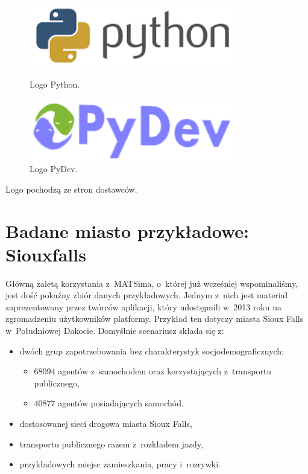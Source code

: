 \documentclass[twoside,12pt]{report}
\begin{document}
\begin{figure}[h]
\begin{flushleft}
	\begin{minipage}[]{.47\textwidth}
	\vspace*{30px}
	\centering
	\includegraphics[width=0.8\textwidth]{img/py}
	\caption{Logo Python.}
	\end{minipage}%
\end{flushleft}
\begin{flushright}
	\begin{minipage}[]{.47\textwidth}
	\centering
	\includegraphics[width=0.8\textwidth]{img/pydev}
	\caption{Logo PyDev.}
	\end{minipage}
\end{flushright}
\end{figure}

Logo pochodzą ze stron dostawców\cite{java}\cite{eclipse}\cite{python}\cite{pydev}.

\section{Badane miasto przykładowe: Siouxfalls}

Główną zaletą korzystania z~MATSima, o~której już wcześniej wspominaliśmy, jest dość pokaźny zbiór danych przykładowych. Jednym z~nich jest materiał zaprezentowany przez twórców aplikacji, który udostępnili w~2013 roku na zgromadzeniu użytkowników platformy\cite{siux}. Przykład ten dotyczy miasta Sioux Falls w~Południowej Dakocie. Domyślnie scenariusz składa się z:

\begin{itemize}
\item dwóch grup zapotrzebowania bez charakterystyk socjodemograficznych:
\begin{itemize}
\item 68094 agentów z~samochodem oraz korzystających z~transportu publicznego,
\item 40877 agentów posiadających samochód.
\end{itemize}
\item dostosowanej sieci drogowa miasta Sioux Falls,
\item transportu publicznego razem z~rozkładem jazdy,
\item przykładowych miejsc zamieszkania, pracy i~rozrywki.
\end{itemize}
\end{document}

